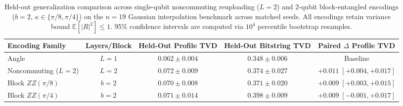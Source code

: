 \begin{table}[t]
\centering
\small
\begin{tabular}{lcccc}
\hline\hline
Encoding Family & Layers/Block & Held-Out Profile TVD & Held-Out Bitstring TVD & Paired $\Delta$ Profile TVD \\
\hline
Angle & $L=1$ & $0.062 \pm 0.004$ & $0.348 \pm 0.006$ & Baseline \\
Noncommuting ($L=2$) & $L=2$ & $0.072 \pm 0.009$ & $0.374 \pm 0.027$ & $+0.011 \; [+0.004, +0.017]$ \\
Block $ZZ(\pi/8)$ & $b=2$ & $0.070 \pm 0.008$ & $0.371 \pm 0.020$ & $+0.009 \; [+0.003, +0.015]$ \\
Block $ZZ(\pi/4)$ & $b=2$ & $0.071 \pm 0.014$ & $0.398 \pm 0.009$ & $+0.009 \; [-0.001, +0.017]$ \\
\hline\hline
\end{tabular}
\caption{Held-out generalization comparison across single-qubit noncommuting reuploading ($L=2$) and 2-qubit block-entangled encodings ($b=2$, $\kappa \in \{\pi/8, \pi/4\}$) on the $n=19$ Gaussian interpolation benchmark across matched seeds. All encodings retain variance bound $\mathbb{E}[|R|^2] \le 1$. 95\% confidence intervals are computed via $10^4$ percentile bootstrap resamples.}
\label{tab:encoding_benchmark}
\end{table}
